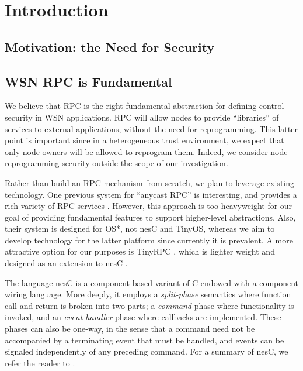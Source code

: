 \section{Introduction}

\subsection{Motivation: the Need for Security}

\subsection{WSN RPC is Fundamental}

We believe that RPC is the right fundamental abstraction for defining control security in WSN
applications. RPC will allow nodes to provide ``libraries'' of services to external
applications, without the need for reprogramming. This latter point is important since in a
heterogeneous trust environment, we expect that only node owners will be allowed to reprogram
them. Indeed, we consider node reprogramming security outside the scope of our investigation.

Rather than build an RPC mechanism from scratch, we plan to leverage existing technology. One
previous system for ``anycast RPC'' is interesting, and provides a rich variety of RPC services
\cite{bergstrom-pandey-mass07}. However, this approach is too heavyweight for our goal of
providing fundamental features to support higher-level abstractions. Also, their system is
designed for OS*, not nesC and TinyOS, whereas we aim to develop technology for the latter
platform since currently it is prevalent. A more attractive option for our purposes is TinyRPC
\cite{may-etal-mass05}, which is lighter weight and designed as an extension to nesC
\cite{781133}.

The language nesC is a component-based variant of C endowed with a component wiring language.
More deeply, it employs a \emph{split-phase} semantics where function call-and-return is broken
into two parts; a \emph{command} phase where functionality is invoked, and an \emph{event
  handler} phase where callbacks are implemented. These phases can also be one-way, in the sense
that a command need not be accompanied by a terminating event that must be handled, and events
can be signaled independently of any preceding command. For a summary of nesC, we refer the
reader to \cite{781133}.

